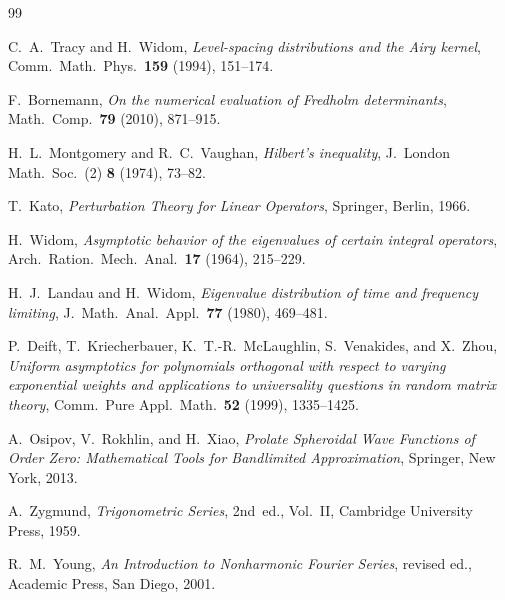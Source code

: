 \documentclass[12pt,a4paper]{amsart}
\theoremstyle{definition}
\begin{document}
\begin{thebibliography}{99}

C.~A.~Tracy and H.~Widom,
\textit{Level-spacing distributions and the Airy kernel},
Comm.\ Math.\ Phys.\ \textbf{159} (1994), 151--174.

F.~Bornemann,
\textit{On the numerical evaluation of Fredholm determinants},
Math.\ Comp.\ \textbf{79} (2010), 871--915.

H.~L.~Montgomery and R.~C.~Vaughan,
\textit{Hilbert's inequality},
J.\ London Math.\ Soc.\ (2) \textbf{8} (1974), 73--82.

T.~Kato,
\textit{Perturbation Theory for Linear Operators},
Springer, Berlin, 1966.

H.~Widom,
\textit{Asymptotic behavior of the eigenvalues of certain integral operators},
Arch.\ Ration.\ Mech.\ Anal.\ \textbf{17} (1964), 215--229.

H.~J.~Landau and H.~Widom,
\textit{Eigenvalue distribution of time and frequency limiting},
J.\ Math.\ Anal.\ Appl.\ \textbf{77} (1980), 469--481.

P.~Deift, T.~Kriecherbauer, K.~T.-R.~McLaughlin, S.~Venakides,
and X.~Zhou,
\textit{Uniform asymptotics for polynomials orthogonal with respect
to varying exponential weights and applications to universality
questions in random matrix theory},
Comm.\ Pure Appl.\ Math.\ \textbf{52} (1999), 1335--1425.

A.~Osipov, V.~Rokhlin, and H.~Xiao,
\textit{Prolate Spheroidal Wave Functions of Order Zero:
Mathematical Tools for Bandlimited Approximation},
Springer, New York, 2013.

A.~Zygmund,
\textit{Trigonometric Series}, 2nd~ed., Vol.~II,
Cambridge University Press, 1959.

R.~M.~Young,
\textit{An Introduction to Nonharmonic Fourier Series}, revised ed.,
Academic Press, San Diego, 2001.

\end{thebibliography}
\end{document}
